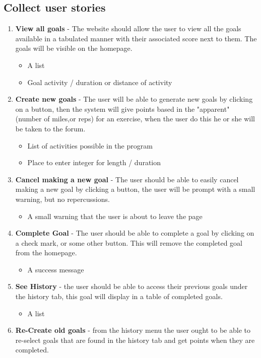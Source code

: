 \documentclass[a4paper]{article}
\begin{document}
\subsection{Collect user stories}
\begin{enumerate}
\item \textbf{View all goals} - The website should allow the user to view all the goals available in a tabulated manner with their associated score next to them. The goals will be visible on the homepage.
\begin{itemize}
\item A list
\item Goal activity / duration or distance of activity
\end{itemize}
\item \textbf{Create new goals} - The user will be able to generate new goals by clicking on a button, then the system will give points based in the "apparent" (number of miles,or reps) for an exercise, when the user do this he or she will be taken to the forum.
\begin{itemize}
\item List of activities possible in the program
\item Place to enter integer for length / duration
\end{itemize}
\item \textbf{Cancel making a new goal} - The user should be able to easily cancel making a new goal by clicking a button, the user will be prompt with a small warning, but no repercussions. 
\begin{itemize}
\item A small warning that the user is about to leave the page
\end{itemize}
\item \textbf{Complete Goal} - The user should be able to complete a goal by clicking on a check mark, or some other button. This will remove the completed goal from the homepage.
\begin{itemize}
\item A success message
\end{itemize}
\item \textbf{See History } - the user should be able to access their previous goals under the history tab, this goal will display in a table of completed goals.
\begin{itemize}
\item A list
\end{itemize}
\item \textbf{Re-Create old goals} - from the history menu the user ought to be able to re-select goals that are found in the history tab and get points when they are completed.

\end{enumerate}
\end{document}
